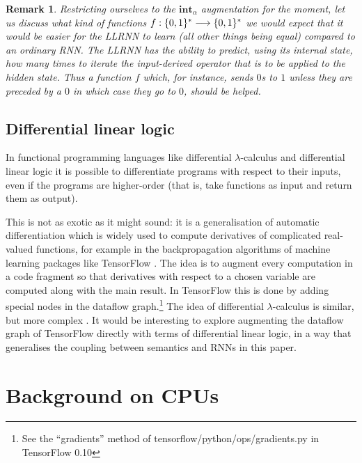 \documentclass[english,letter paper,12pt,leqno]{article}
\theoremstyle{example}
\newtheorem{remark}[theorem]{Remark}
\numberwithin{equation}{section}
\begin{document}
\begin{remark} Restricting ourselves to the $\textbf{int}_\alpha$ augmentation for the moment, let us discuss what kind of functions $f: \{0,1\}^* \longrightarrow \{0,1\}^*$ we would expect that it would be easier for the LLRNN to learn (all other things being equal) compared to an ordinary RNN. The LLRNN has the ability to predict, using its internal state, how many times to iterate the input-derived operator that is to be applied to the hidden state. Thus a function $f$ which, for instance, sends $0$s to $1$ unless they are preceded by a $0$ in which case they go to $0$, should be helped.
\end{remark}

\subsection{Differential linear logic}\label{section:differential_linear}

In functional programming languages like differential $\lambda$-calculus \cite{difflambda} and differential linear logic \cite{ehrhard-survey} it is possible to differentiate programs with respect to their inputs, even if the programs are higher-order (that is, take functions as input and return them as output). 

This is not as exotic as it might sound: it is a generalisation of automatic differentiation \cite{griewank} which is widely used to compute derivatives of complicated real-valued functions, for example in the backpropagation algorithms of machine learning packages like TensorFlow \cite[\S 4.1]{tensorflow}. The idea is to augment every computation in a code fragment so that derivatives with respect to a chosen variable are computed along with the main result. In TensorFlow this is done by adding special nodes in the dataflow graph.\footnote{See the ``gradients'' method of tensorflow/python/ops/gradients.py in TensorFlow 0.10} The idea of differential $\lambda$-calculus is similar, but more complex \cite{manzyuk}. It would be interesting to explore augmenting the dataflow graph of TensorFlow directly with terms of differential linear logic, in a way that generalises the coupling between semantics and RNNs in this paper.

\appendix

\section{Background on CPUs}\label{section:appendix_cpu}
\end{document}
